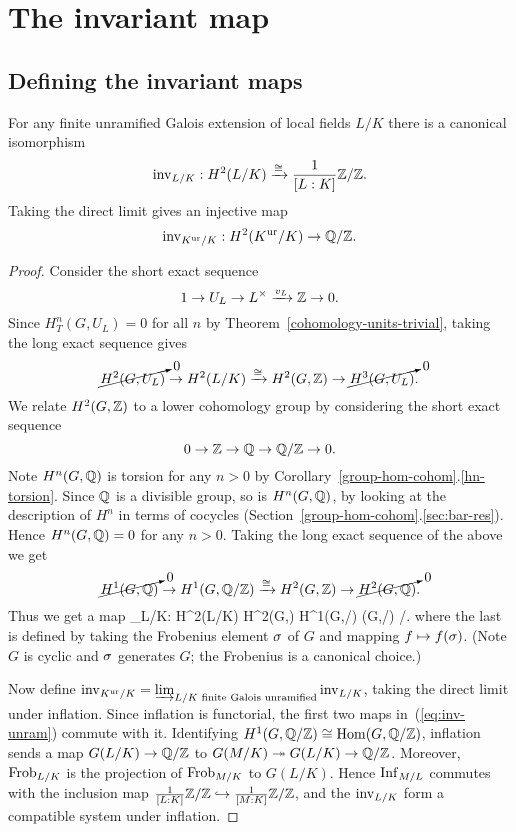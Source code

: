 \section{The invariant map}
\subsection{Defining the invariant maps}
\begin{pr}
For any finite unramified Galois extension of local fields $L/K$ there is a canonical isomorphism
\[
\operatorname{inv}_{L/K}:H^2(L/K)\xrightarrow{\cong} \frac{1}{[L:K]}\mathbb{Z}/\mathbb{Z}.
\]
Taking the direct limit gives an injective map
\[
\inv_{K\ur/K}:H^2(K\ur/K)%
\to\Q/\Z.
\]
\end{pr}
\begin{proof}
Consider the short exact sequence
\[
1\to U_L\to L^{\times} \xrightarrow{v_L}\mathbb{Z}\to 0.
\]
Since $H_T^n(G,U_L)=0$ for all $n$ by Theorem~\ref{cohomology-units-trivial}, taking the long exact sequence gives
\[
\cancelto{0}{H^2(G,U_L)}
\to H^2(L/K)\xrightarrow{\cong} H^2(G,\mathbb{Z}) \to \cancelto{0}{H^3(G,U_L)}.
\]
We relate $H^2(G,\mathbb{Z})$ to a lower cohomology group by considering the short exact sequence
\[
0\to \mathbb{Z}\to \mathbb{Q}\to \mathbb{Q}/\mathbb{Z}\to 0.
\]
Note $H^n(G,\mathbb{Q})$ is torsion for any $n>0$ by Corollary~\ref{group-hom-cohom}.\ref{hn-torsion}. Since $\mathbb{Q}$ is a divisible group, so is $H^n(G,\mathbb{Q})$, by looking at the description of $H^n$ in terms of cocycles (Section~\ref{group-hom-cohom}.\ref{sec:bar-res}). 
Hence 
$H^n(G,\mathbb{Q})=0$ for any $n>0$.
Taking the long exact sequence of the above we get
\[
\cancelto{0}{H^1(G,\mathbb{Q})} \to H^1(G,\mathbb{Q}/\mathbb{Z}) \xrightarrow{\cong}
H^2(G,\mathbb{Z}) \to \cancelto{0}{H^2(G,\mathbb{Q})}.
\]
Thus we get a map
\inv_{L/K}:\quad 
H^2(L/K)\xra{\cong} H^2(G,\Z) \xleftarrow{\cong} H^1(G,\Q/\Z)  \Hom(G,\Q/\Z) %
\xra{\cong}\rc{[L:K]}\Z/\Z.
\eeq
where the last is defined by taking the Frobenius element $\sigma$ of $G$ and mapping $f\mapsto f(\sigma)$. (Note $G$ is cyclic and $\sigma$ generates $G$; the Frobenius is a canonical choice.)

Now define $\operatorname{inv}_{K^{\text{ur}}/K}=\varinjlim_{L/K\text{ finite Galois unramified}} \operatorname{inv}_{L/K}$, taking the direct limit under inflation. Since inflation is functorial, the first two maps in~(\ref{eq:inv-unram}) commute with it. Identifying $H^1(G,\mathbb{Q}/\mathbb{Z})\cong \operatorname{Hom}(G,\mathbb{Q}/\mathbb{Z})$, inflation sends a map $G(L/K)\to \mathbb{Q}/\mathbb{Z}$ to $G(M/K)\twoheadrightarrow G(L/K)\to \mathbb{Q}/\mathbb{Z}$. Moreover, $\operatorname{Frob}_{L/K}$ is the projection of $\operatorname{Frob}_{M/K}$ to $G(L/K)$. Hence $\operatorname{Inf}_{M/L}$ commutes with the inclusion map $\frac{1}{[L:K]}\mathbb{Z}/\mathbb{Z}\hookrightarrow \frac{1}{[M:K]}\mathbb{Z}/\mathbb{Z}$, and the $\operatorname{inv}_{L/K}$ form a compatible system under inflation.
\end{proof}
